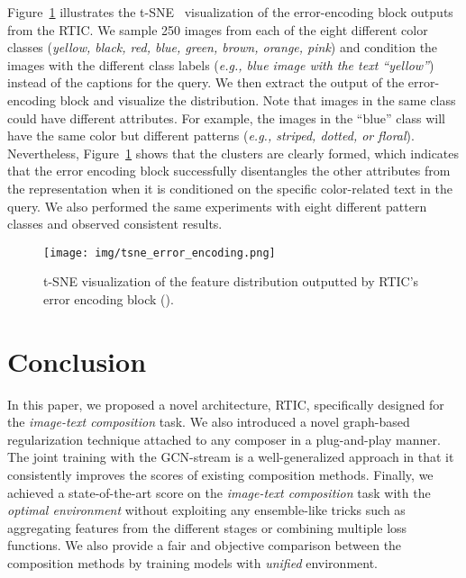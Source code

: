 \documentclass[10pt,twocolumn,letterpaper]{article}
\begin{document}
Figure~\ref{fig:tsne_error_encoding} illustrates the t-SNE~\cite{van2008visualizing} visualization of the error-encoding block outputs from the RTIC. We sample 250 images from each of the eight different color classes (\textit{yellow, black, red, blue, green, brown, orange, pink}) and condition the images with the different class labels (\textit{e.g., blue image with the text ``yellow''}) instead of the captions for the query. We then extract the output of the error-encoding block and visualize the distribution. Note that images in the same class could have different attributes. For example, the images in the ``blue'' class will have the same color but different patterns (\textit{e.g., striped, dotted, or floral}). Nevertheless, Figure~\ref{fig:tsne_error_encoding} shows that the clusters are clearly formed, which indicates that the error encoding block successfully disentangles the other attributes from the representation when it is conditioned on the specific color-related text in the query. We also performed the same experiments with eight different pattern classes and observed consistent results.

\begin{figure}[t]
    \begin{center}
	    \texttt{[image: img/tsne\_error\_encoding.png]}
	\end{center}
	\caption{t-SNE visualization of the feature distribution outputted by RTIC's error encoding block ().}
	\label{fig:tsne_error_encoding}
\end{figure}


\section{Conclusion}
In this paper, we proposed a novel architecture, RTIC, specifically designed for the \textit{image-text composition} task. We also introduced a novel graph-based regularization technique attached to any composer in a plug-and-play manner. The joint training with the GCN-stream is a well-generalized approach in that it consistently improves the scores of existing composition methods. Finally, we achieved a state-of-the-art score on the \textit{image-text composition} task with the \textit{optimal environment} without exploiting any ensemble-like tricks such as aggregating features from the different stages or combining multiple loss functions. We also provide a fair and objective comparison between the composition methods by training models with \textit{unified} environment.
\end{document}
